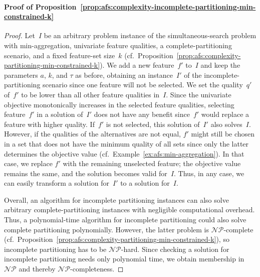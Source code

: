 \documentclass{article}
\theoremstyle{definition}
\begin{document}
\paragraph{Proof of Proposition~\ref{prop:afs:complexity-incomplete-partitioning-min-constrained-k}}
%
\begin{proof}
Let~$I$ be an arbitrary problem instance of the simultaneous-search problem with min-aggregation, univariate feature qualities, a complete-partitioning scenario, and a fixed feature-set size~$k$ (cf.~Proposition~\ref{prop:afs:complexity-partitioning-min-constrained-k}).
We add a new feature~$f'$ to~$I$ and keep the parameters $a$, $k$, and $\tau$ as before, obtaining an instance~$I'$ of the incomplete-partitioning scenario since one feature will not be selected.
We set the quality~$q'$ of~$f'$ to be lower than all other feature qualities in~$I$.
Since the univariate objective monotonically increases in the selected feature qualities, selecting feature~$f'$ in a solution of~$I'$ does not have any benefit since~$f'$ would replace a feature with higher quality.
If~$f'$ is not selected, this solution of~$I'$ also solves~$I$.
However, if the qualities of the alternatives are not equal, $f'$ might still be chosen in a set that does not have the minimum quality of all sets since only the latter determines the objective value (cf.~Example~\ref{ex:afs:min-aggregation}).
In that case, we replace $f'$ with the remaining unselected feature; the objective value remains the same, and the solution becomes valid for~$I$.
Thus, in any case, we can easily transform a solution for~$I'$ to a solution for~$I$.

Overall, an algorithm for incomplete partitioning instances can also solve arbitrary complete-partitioning instances with negligible computational overhead.
Thus, a polynomial-time algorithm for incomplete partitioning could also solve complete partitioning polynomially.
However, the latter problem is $\mathcal{NP}$-complete (cf.~Proposition~\ref{prop:afs:complexity-partitioning-min-constrained-k}), so incomplete partitioning has to be $\mathcal{NP}$-hard.
Since checking a solution for incomplete partitioning needs only polynomial time, we obtain membership in $\mathcal{NP}$ and thereby $\mathcal{NP}$-completeness.
\end{proof}
\end{document}
